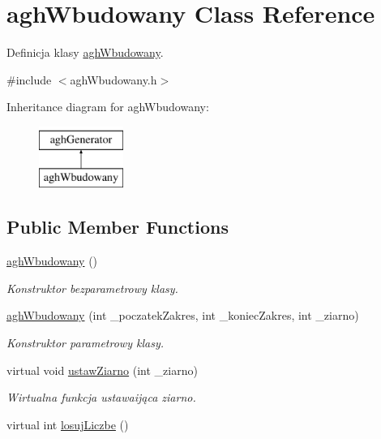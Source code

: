 \hypertarget{classaghWbudowany}{\section{agh\-Wbudowany \-Class \-Reference}
\label{classaghWbudowany}
}


\-Definicja klasy \hyperlink{classaghWbudowany}{agh\-Wbudowany}.  




{\ttfamily \#include $<$agh\-Wbudowany.\-h$>$}

\-Inheritance diagram for agh\-Wbudowany\-:\begin{figure}[H]
\begin{center}
\leavevmode
\includegraphics[height=2.000000cm]{classaghWbudowany}
\end{center}
\end{figure}
\subsection*{\-Public \-Member \-Functions}
\begin{DoxyCompactItemize}
\item 
\hypertarget{classaghWbudowany_a74ef28fbbe2b8563c6fd2f2c7acbdbe5}{\hyperlink{classaghWbudowany_a74ef28fbbe2b8563c6fd2f2c7acbdbe5}{agh\-Wbudowany} ()}\label{classaghWbudowany_a74ef28fbbe2b8563c6fd2f2c7acbdbe5}

\begin{DoxyCompactList}\small\item\em \-Konstruktor bezparametrowy klasy. \end{DoxyCompactList}\item 
\hyperlink{classaghWbudowany_a50e3179651d25e86e277a2d18a5c6859}{agh\-Wbudowany} (int \-\_\-poczatek\-Zakres, int \-\_\-koniec\-Zakres, int \-\_\-ziarno)
\begin{DoxyCompactList}\small\item\em \-Konstruktor parametrowy klasy. \end{DoxyCompactList}\item 
virtual void \hyperlink{classaghWbudowany_a5d636a572dde32c97ba398420aa1afac}{ustaw\-Ziarno} (int \-\_\-ziarno)
\begin{DoxyCompactList}\small\item\em \-Wirtualna funkcja ustawaijąca ziarno. \end{DoxyCompactList}\item 
virtual int \hyperlink{classaghWbudowany_adcf9ea98875775913421076e4c277e56}{losuj\-Liczbe} ()
\end{DoxyCompactItemize}



